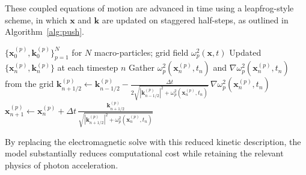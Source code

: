 \documentclass{article}
\begin{document}
These coupled equations of motion are advanced in time using a leapfrog-style
scheme, in which $\mathbf{x}$ and $\mathbf{k}$ are updated on staggered
half-steps, as outlined in Algorithm~\ref{alg:push}.

\newpage
\begin{algorithm}
\caption{Leapfrog update of a photon macro-particle's position $\mathbf{x}$ and 
wave vector $\mathbf{k}$ at each timestep, using the local plasma frequency 
$\omega_p^2$ and its gradient gathered from the grid.}
\label{alg:push}
\begin{algorithmic}[1]
\Require $\{\mathbf{x}_0^{(p)}, \mathbf{k}_0^{(p)}\}_{p=1}^{N}$ for $N$ macro-particles; grid field $\omega_p^2(\mathbf{x}, t)$
\Ensure Updated $\{\mathbf{x}_n^{(p)}, \mathbf{k}_n^{(p)}\}$ at each timestep $n$
        \State Gather $\omega_p^2(\mathbf{x}_n^{(p)}, t_n)$ and $\nabla \omega_p^2(\mathbf{x}_n^{(p)}, t_n)$ from the grid
        \State $\displaystyle \mathbf{k}_{n+1/2}^{(p)} \gets \mathbf{k}_{n-1/2}^{(p)}
            - \frac{\Delta t}{2\sqrt{|\mathbf{k}_{n-1/2}^{(p)}|^2 + \omega_p^2(\mathbf{x}_n^{(p)}, t_n)}}
            \,\nabla \omega_p^2(\mathbf{x}_n^{(p)}, t_n)$
        \State $\displaystyle \mathbf{x}_{n+1}^{(p)} \gets \mathbf{x}_n^{(p)}
            + \Delta t \, \frac{\mathbf{k}_{n+1/2}^{(p)}}{\sqrt{|\mathbf{k}_{n+1/2}^{(p)}|^2 + \omega_p^2(\mathbf{x}_n^{(p)}, t_n)}}$
    \EndFor
\EndFor
\end{algorithmic}
\end{algorithm}

By replacing the electromagnetic solve with this reduced kinetic description, the
model substantially reduces computational cost while retaining the relevant physics
of photon acceleration. 


\printbibliography
\end{document}
